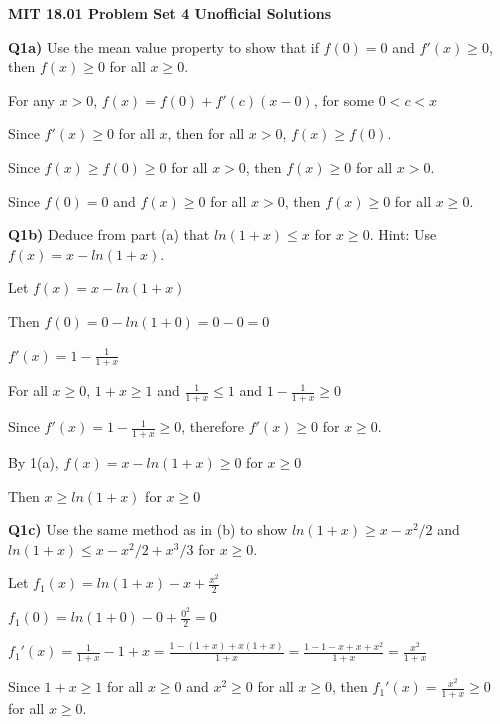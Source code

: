 \documentclass[9pt]{article}
\begin{document}
\begin{center}
  \large\textbf{MIT 18.01 Problem Set 4 Unofficial Solutions}
\end{center}

\begin{tcolorbox}
  \textbf{Q1a)} Use the mean value property to show that if $f(0) = 0$ and $f'(x) \geq 0$, then $f(x) \geq 0$ for all $x \geq 0$.
\end{tcolorbox}

For any $x > 0$, $f(x) = f(0) + f'(c)(x - 0)$, for some $0 < c < x$

Since $f'(x) \geq 0$ for all $x$, then for all $x > 0$, $f(x) \geq f(0)$.

Since $f(x) \geq f(0) \geq 0$ for all $x > 0$, then $f(x) \geq 0$ for all $x > 0$.

Since $f(0) = 0$ and $f(x) \geq 0$ for all $x > 0$, then $f(x) \geq 0$ for all $x \geq 0$.


\begin{tcolorbox}
  \textbf{Q1b)} Deduce from part (a) that $ln(1 + x) \leq x$ for $x \geq 0$. Hint: Use $f(x) = x - ln(1 + x)$.
\end{tcolorbox}

Let $f(x) = x - ln(1 + x)$

Then $f(0) = 0 - ln(1 + 0) = 0 - 0 = 0$

$f'(x) = 1 - \frac{1}{1 + x}$

For all $x \geq 0$, $1 + x \geq 1$ and $\frac{1}{1 + x} \leq 1$ and $1 - \frac{1}{1 + x} \geq 0$

Since $f'(x) = 1 - \frac{1}{1 + x} \geq 0$, therefore $f'(x) \geq 0$ for $x \geq 0$.

By 1(a), $f(x) = x - ln(1 + x) \geq 0$ for $x \geq 0$

Then $x \geq ln(1 + x)$ for $x \geq 0$


\begin{tcolorbox}
  \textbf{Q1c)} Use the same method as in (b) to show $ln(1 + x) \geq x - x^2 / 2$ and $ln(1 + x) \leq x - x^2 / 2 + x^3 / 3$ for $x \geq 0$.
\end{tcolorbox}

Let $f_1(x) = ln(1 + x) - x + \frac{x^2}{2}$

$f_1(0) = ln(1 + 0) - 0 + \frac{0^2}{2} = 0$

$f_1'(x) = \frac{1}{1 + x} - 1 + x = \frac{1 - (1 + x) + x(1 + x)}{1 + x} = \frac{1 - 1 - x + x + x^2}{1 + x} = \frac{x^2}{1 + x}$

Since $1 + x \geq 1$ for all $x \geq 0$ and $x^2 \geq 0$ for all $x \geq 0$, then $f_1'(x) = \frac{x^2}{1 + x} \geq 0$ for all $x \geq 0$.
\end{document}
